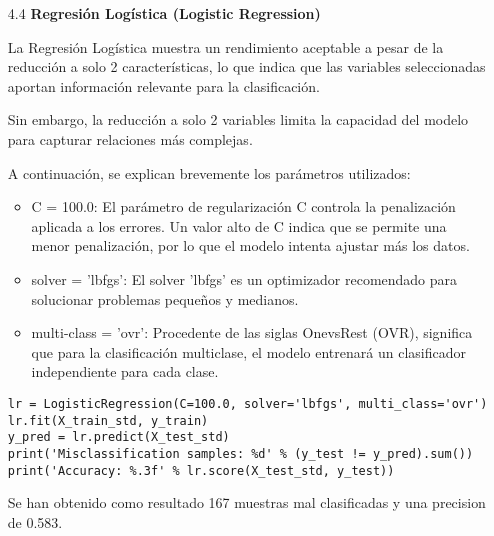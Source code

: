 \documentclass{article}
\begin{document}
\begin{itemize}

\item[4.4]  {\bf Regresi\'on Log\'istica (Logistic Regression)}

La Regresi\'on Log\'istica muestra un rendimiento aceptable a pesar de la reducci\'on a solo 2 caracter\'isticas, lo que indica que las variables seleccionadas aportan informaci\'on relevante para la clasificaci\'on.

Sin embargo, la reducci\'on a solo 2 variables limita la capacidad del modelo para capturar relaciones m\'as complejas.

A continuaci\'on, se explican brevemente los par\'ametros utilizados:

\begin{itemize}

\item
C = 100.0: El par\'ametro de regularizaci\'on C controla la penalizaci\'on aplicada a los errores. Un valor alto de C indica que se permite una menor penalizaci\'on, por lo que el modelo intenta ajustar m\'as los datos.

\item
solver = 'lbfgs': El solver 'lbfgs' es un optimizador recomendado para solucionar problemas pequeños y medianos.

\item
multi-class = 'ovr': Procedente de las siglas OnevsRest (OVR), significa que para la
clasificaci\'on multiclase, el modelo entrenar\'a un clasificador independiente para cada clase.

\end{itemize}

\begin{tcolorbox}[width=14cm]
\begin{scriptsize}
\begin{verbatim}
lr = LogisticRegression(C=100.0, solver='lbfgs', multi_class='ovr')
lr.fit(X_train_std, y_train)
y_pred = lr.predict(X_test_std)
print('Misclassification samples: %d' % (y_test != y_pred).sum())
print('Accuracy: %.3f' % lr.score(X_test_std, y_test))
\end{verbatim}
\end{scriptsize}
\end{tcolorbox}

Se han obtenido como resultado 167 muestras mal clasificadas y una precision de 0.583.

\end{itemize}
\end{document}
